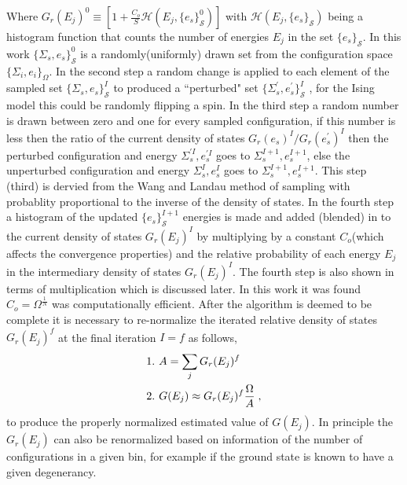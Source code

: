 \documentclass[aps,prl,reprint,superscriptaddress,showkeys]{revtex4-1}
\begin{document}
Where  $G_{r}(E_j)^0 \equiv [1 +  \frac{C_o}{S}\mathcal{H}(E_j,\{e_s\}_{\mathcal{S}}^0)]$ with $\mathcal{H}(E_j,\{e_s\}_{\mathcal{S}})$ being a histogram function that counts the number of energies $E_j$ in the set $\{e_s\}_{\mathcal{S}}$. In this work $\{\Sigma_{s},e_s\}_{\mathcal{S}}^0$  is a randomly(uniformly) drawn set from the configuration space $\{ \Sigma_i, e_i \}_\Omega $. In the second step  a random change is applied to each element of the sampled set $\{\Sigma_{s},e_s\}_{\mathcal{S}}^I$ to produced a ``perturbed" set $ \{\Sigma_{s}^{'},e_s^{'}\}_{\mathcal{S}}^I$ , for the Ising model this could be randomly flipping a spin.  In the third step a random number is drawn between zero and one for every sampled configuration, if this number is less then the ratio of the current density of states $G_{r}(e_s)^{I}/G_{r}(e_s^{'})^{I}$ then the perturbed configuration and energy  $\Sigma_{s}^{'I},e_s^{'I}$  goes to $\Sigma_{s}^{I+1},e_s^{I+1}$,  else the unperturbed configuration and energy $\Sigma_{s}^{I},e_s^I$  goes to $\Sigma_{s}^{I+1},e_s^{I+1}$. This step (third) is dervied from the Wang and Landau method of sampling with probablity proportional to the inverse of the density of states.  In the fourth step a histogram of the updated $\{ e_s \}^{I+1}_{\mathcal{S}}$ energies is made and added (blended) in to the current density of states $G_{r}(E_j)^I$   by multiplying  by a constant $C_{o}$(which affects the convergence properties) and the relative probability of each energy $E_j$ in the  intermediary density of states $G_{r}(E_j)^{I}$. The fourth step is also shown in terms of multiplication which is discussed later. In this work it was found  $C_{o}=\Omega^{\frac{1}{N}}$ was computationally efficient. After the algorithm is deemed to be complete it is necessary to re-normalize the iterated relative density of states $G_{r}(E_j)^f$ at the final iteration $I=f$ as follows, 
\begin{equation}
\begin{split}
&1. \hspace{0.125cm} A = \sum_jG_{r}(E_j)^f\\
&2. \hspace{0.125cm} G(E_j)\approx G_{r}(E_j)^f \frac{\Omega}{A} \;,
\end{split}
\label{renormalize}
\end{equation}
to produce the properly normalized estimated value of $G(E_j)$. In principle the $G_{r}(E_j)$ can also be renormalized based on information of the number of configurations in a given bin, for example if the ground state is known to have a given degenerancy.  
\end{document}
